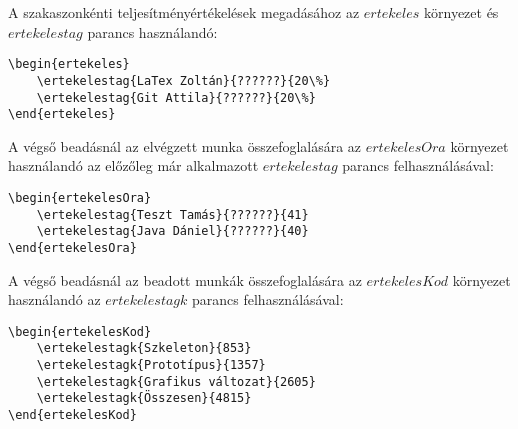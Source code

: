 \documentclass[]{article}
\begin{document}
A szakaszonkénti teljesítményértékelések megadásához az $ertekeles$ környezet és $ertekelestag$ parancs használandó:
\begin{lstlisting}
\begin{ertekeles}
    \ertekelestag{LaTex Zoltán}{??????}{20\%}
    \ertekelestag{Git Attila}{??????}{20\%}
\end{ertekeles}
\end{lstlisting}
\begin{ertekeles}
\end{ertekeles}
A végső beadásnál az elvégzett munka összefoglalására az $ertekelesOra$ környezet használandó az előzőleg már alkalmazott $ertekelestag$ parancs felhasználásával:
\begin{lstlisting}
\begin{ertekelesOra}
    \ertekelestag{Teszt Tamás}{??????}{41}
    \ertekelestag{Java Dániel}{??????}{40}
\end{ertekelesOra}
\end{lstlisting}
\begin{ertekelesOra}
\end{ertekelesOra}
A végső beadásnál az beadott munkák összefoglalására az $ertekelesKod$ környezet használandó az $ertekelestagk$ parancs felhasználásával:
\begin{lstlisting}
\begin{ertekelesKod}
    \ertekelestagk{Szkeleton}{853}
    \ertekelestagk{Prototípus}{1357}
    \ertekelestagk{Grafikus változat}{2605}
    \ertekelestagk{Összesen}{4815}
\end{ertekelesKod}
\end{lstlisting}
\begin{ertekelesKod}
\end{ertekelesKod}
\end{document}
